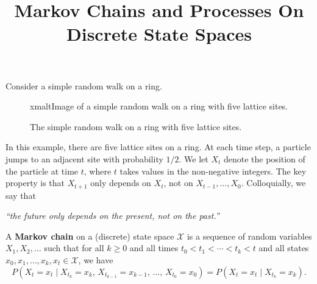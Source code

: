 \documentclass{ximera}
\title{Markov Chains and Processes On Discrete State Spaces}
\begin{document}
\begin{abstract}
\end{abstract}
\maketitle

Consider a simple random walk on a ring.
\vspace{1cm}

\begin{figure}[h]
\begin{center}

xmalt{Image of a simple random walk on a ring with five lattice sites.}
\caption{The simple random walk on a ring with five lattice sites.}
\label{markov-ring}
\end{center}
\end{figure}

In this example, there are five lattice sites on a ring. At each time step, a particle jumps to an adjacent
site with probability $1/2$. We let $X_t$ denote the position of the particle at time $t$, where $t$ takes
values in the non-negative integers. The key property is that $X_{t+1}$ only depends on $X_t$, not on
$X_{t-1}, \ldots, X_0$. Colloquially, we say that

\begin{center}
\textit{``the future only depends on the present, not on the past.''}
\end{center}

\begin{definition}
A \textbf{Markov chain} on a (discrete) state space $\mathcal{X}$ is a sequence of random variables
$X_1, X_2, \ldots$ such that for all $k \geq 0$ and all times $t_0 < t_1 < \cdots < t_k < t$ and all states
$x_0, x_1, \ldots, x_k, x_t \in \mathcal{X}$, we have
\[
P(X_t = x_t \mid X_{t_k} = x_k,\, X_{t_{k-1}} = x_{k-1},\, \ldots,\, X_{t_0} = x_0)
= P(X_t = x_t \mid X_{t_k} = x_k).
\]
\end{definition}
\end{document}
